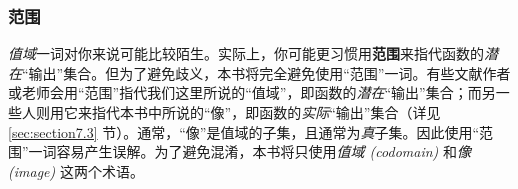 \subsubsection*{范围}

\emph{值域}一词对你来说可能比较陌生。实际上，你可能更习惯用\textbf{范围}来指代函数的\emph{潜在}``输出''集合。但为了避免歧义，本书将完全避免使用``范围''一词。有些文献作者或老师会用``范围''指代我们这里所说的``值域''，即函数的\emph{潜在}``输出''集合；而另一些人则用它来指代本书中所说的``像''，即函数的\emph{实际}``输出''集合（详见 \ref{sec:section7.3} 节）。通常，``像''是值域的子集，且通常为\emph{真}子集。因此使用``范围''一词容易产生误解。为了避免混淆，本书将只使用\emph{值域 (codomain) }和\emph{像 (image) }这两个术语。